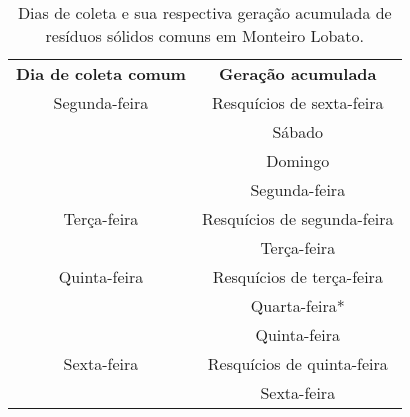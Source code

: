 \begin{table}[htbp]
	\centering
	\caption{Dias de coleta e sua respectiva geração acumulada de resíduos sólidos comuns em Monteiro Lobato.}
	\begin{tabular}{c|c}
		\rowcolor[rgb]{ .969,  .588,  .275} \textcolor[rgb]{ 1,  1,  1}{\textbf{Dia de coleta comum}} & \textcolor[rgb]{ 1,  1,  1}{\textbf{Geração acumulada}} \\
		\rowcolor[rgb]{ .992,  .914,  .851} Segunda-feira & Resquícios de sexta-feira \\
		\rowcolor[rgb]{ .992,  .914,  .851}       & Sábado \\
		\rowcolor[rgb]{ .992,  .914,  .851}       & Domingo \\
		\rowcolor[rgb]{ .992,  .914,  .851}       & Segunda-feira \\
		\rowcolor[rgb]{ .984,  .831,  .706} Terça-feira & Resquícios de segunda-feira \\
		\rowcolor[rgb]{ .984,  .831,  .706}       & Terça-feira \\
		\rowcolor[rgb]{ .992,  .914,  .851} Quinta-feira & Resquícios de terça-feira \\
		\rowcolor[rgb]{ .992,  .914,  .851}       & Quarta-feira* \\
		\rowcolor[rgb]{ .992,  .914,  .851}       & Quinta-feira \\
		\rowcolor[rgb]{ .984,  .831,  .706} Sexta-feira & Resquícios de quinta-feira \\
		\rowcolor[rgb]{ .984,  .831,  .706}       & Sexta-feira \\
	\end{tabular}%
	\label{tab:coleta_geracao}%
\end{table}%
